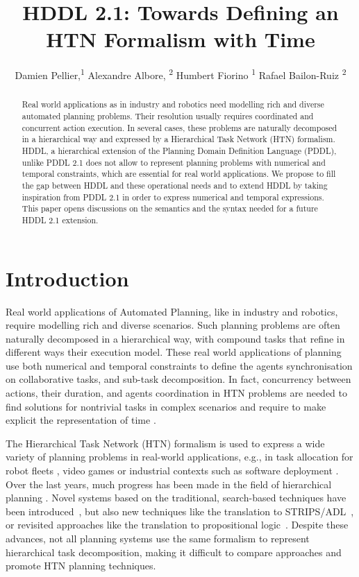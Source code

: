 \documentclass[letterpaper]{article} %
\title{HDDL 2.1: Towards Defining an HTN Formalism with Time}
\author {
    Damien Pellier,\textsuperscript{\rm 1}
    Alexandre Albore, \textsuperscript{\rm 2}
    Humbert Fiorino \textsuperscript{\rm 1}
    Rafael Bailon-Ruiz \textsuperscript{\rm 2}
}
\begin{document}
\maketitle

\begin{abstract}
  Real world applications as in industry and robotics need modelling rich and diverse automated planning problems. Their resolution usually requires coordinated and concurrent action execution. In several cases, these problems are naturally decomposed in a hierarchical way and expressed by a Hierarchical Task Network (HTN) formalism.
  HDDL, a hierarchical extension of the Planning Domain Definition Language (PDDL), unlike PDDL 2.1 does not allow to represent planning problems with numerical and temporal constraints, which are essential for real world applications. We propose to fill the gap between HDDL and these operational needs and to extend HDDL by taking inspiration from  PDDL 2.1 in order to express numerical and temporal expressions. This paper opens discussions on the semantics and the syntax needed for a future HDDL 2.1 extension.
\end{abstract}


\section{Introduction}

Real world applications of Automated Planning, like in industry and robotics, require modelling rich and diverse scenarios.
Such  planning problems are often naturally decomposed in a hierarchical way, with compound tasks that refine in different ways their execution model.
These real world applications of planning use both numerical and temporal constraints to define the agents synchronisation on collaborative tasks, and sub-task decomposition. In fact, concurrency between actions, their duration, and agents coordination in HTN problems are needed to find solutions for nontrivial tasks in complex scenarios and require to make explicit the representation of time \citep{ghallabnautraverso2016}.

The Hierarchical Task Network (HTN) formalism \citep{erol94} is used to express a wide variety of planning problems in  real-world applications, e.g., in task allocation for robot fleets \citep{Milot21}, video games \citep{Menif14} or industrial contexts such as software deployment \citep{Georgievski17}. Over the last years, much progress has been made in the field of hierarchical planning \citep{bercher19}. Novel systems based on the traditional, search-based techniques have been introduced~\citep{Bit-Monnot:16,ramoul17,Shivashankar17,Bercher17,Holler19,holler20,Holler21}, but also new techniques like the translation to STRIPS/ADL~\citep{Alford09,Alford16,behnke2022}, or revisited approaches like the translation to propositional logic~\citep{behnke2018totsat,Behnke2019orderchaos,Schreiber2019SAT,Schreiber21,behnke2021}. Despite these advances, not all planning systems use the same formalism to represent hierarchical task decomposition, making it difficult to compare approaches and promote HTN planning techniques. %
\end{document}
